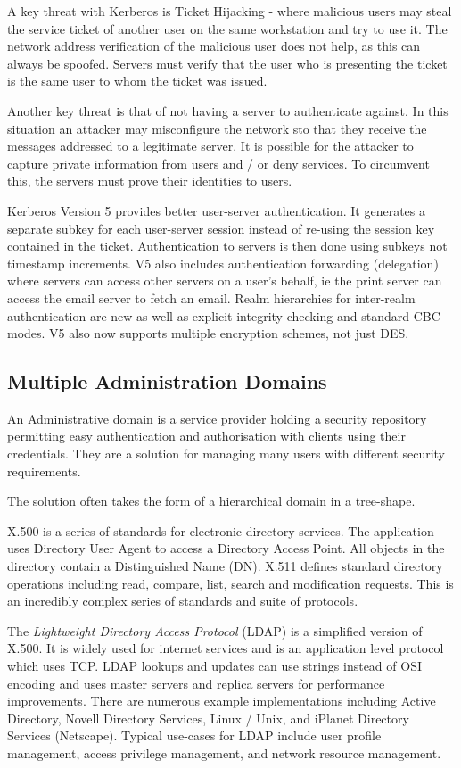 A key threat with Kerberos is Ticket Hijacking - where malicious users may steal the service ticket of another user on the same workstation and try to use it. The network address verification of the malicious user does not help, as this can always be spoofed. Servers must verify that the user who is presenting the ticket is the same user to whom the ticket was issued.

Another key threat is that of not having a server to authenticate against. In this situation an attacker may misconfigure the network sto that they receive the messages addressed to a legitimate server. It is possible for the attacker to capture private information from users and / or deny services. To circumvent this, the servers must prove their identities to users.

Kerberos Version 5 provides better user-server authentication. It generates a separate subkey for each user-server session instead of re-using the session key contained in the ticket. Authentication to servers is then done using subkeys not timestamp increments. V5 also includes authentication forwarding (delegation) where servers can access other servers on a user's behalf, ie the print server can access the email server to fetch an email. Realm hierarchies for inter-realm authentication are new as well as explicit integrity checking and standard CBC modes. V5 also now supports multiple encryption schemes, not just DES. 

\subsection{Multiple Administration Domains}
An Administrative domain is a service provider holding a security repository permitting easy authentication and authorisation with clients using their credentials. They are a solution for managing many users with different security requirements.

The solution often takes the form of a hierarchical domain in a tree-shape.

X.500 is a series of standards for electronic directory services. The application uses Directory User Agent to access a Directory Access Point. All objects in the directory contain a Distinguished Name (DN). X.511 defines standard directory operations including read, compare, list, search and modification requests. This is an incredibly complex series of standards and suite of protocols.

The \textit{Lightweight Directory Access Protocol} (LDAP) is a simplified version of X.500. It is widely used for internet services and is an application level protocol which uses TCP. LDAP lookups and updates can use strings instead of OSI encoding and uses master servers and replica servers for performance improvements. There are numerous example implementations including Active Directory, Novell Directory Services, Linux / Unix, and iPlanet Directory Services (Netscape). Typical use-cases for LDAP include user profile management, access privilege management, and network resource management. 